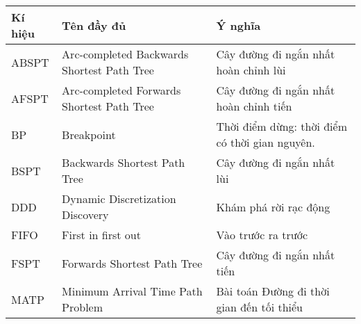 \documentclass[fontsize=14pt,DIV=15pt,twoside=false]{scrbook}
\renewcommand{\arraystretch}{1.3}
\begin{document}
\begin{table}[h]
    \centering
    \small
    \renewcommand{\arraystretch}{1.1}
    \begin{tabularx}{\textwidth}{|p{1.5cm}|X|X|}
    \toprule
    \textbf{Kí hiệu} & \textbf{Tên đầy đủ}                               & \textbf{Ý nghĩa}                                                                    \\ \midrule
    ABSPT            & Arc-completed Backwards Shortest Path Tree        & Cây đường đi ngắn nhất hoàn chỉnh lùi                                               \\ \midrule
    AFSPT            & Arc-completed Forwards Shortest Path Tree         & Cây đường đi ngắn nhất hoàn chỉnh tiến                                              \\ \midrule
    BP               & Breakpoint                                        & Thời điểm dừng: thời điểm có thời gian nguyên.                                     \\ \midrule
    BSPT             & Backwards Shortest Path Tree                      & Cây đường đi ngắn nhất lùi                                                          \\ \midrule
    DDD              & Dynamic Discretization Discovery                  & Khám phá rời rạc động                                                               \\ \midrule
    FIFO             & First in first out                                & Vào trước ra trước                                                                  \\ \midrule
    FSPT             & Forwards Shortest Path Tree                       & Cây đường đi ngắn nhất tiến                                                         \\ \midrule
    MATP             & Minimum Arrival Time Path Problem                 & Bài toán Đường đi thời gian đến tối thiểu                                           \\ \midrule

\end{tabularx}
\end{table}
\end{document}

